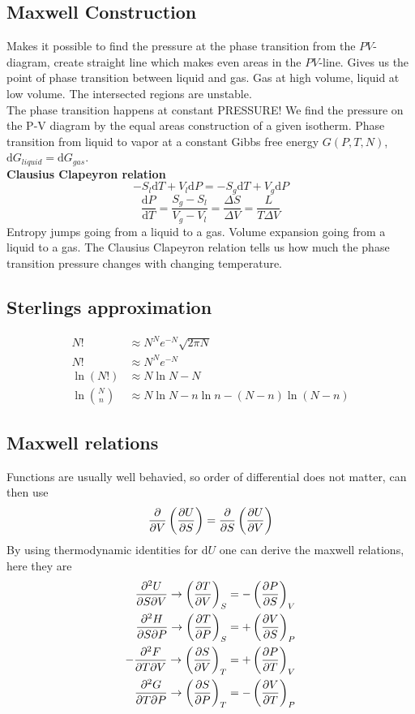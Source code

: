 \documentclass[a4paper, norsk, 8pt]{article}
\begin{document}
\begin{multicols*}{3}
\subsection*{\footnotesize Maxwell Construction}
Makes it possible to find the pressure at the phase transition from the $PV$-diagram, create straight line which makes even areas in the $PV$-line. Gives us the point of phase transition between liquid and gas. Gas at high volume, liquid at low volume. The intersected regions are unstable.\\
The phase transition happens at constant PRESSURE! We find the pressure on the P-V diagram by the equal areas construction of a given isotherm. Phase transition from liquid to vapor at a constant Gibbs free energy $G(P, T, N)$, $\mbox{d}G_{liquid} = \mbox{d}G_{gas}$.\\
\textbf{Clausius Clapeyron relation}
$$-S_l\mbox{d}T + V_l\mbox{d}P = -S_g\mbox{d}T+V_g\mbox{d}P $$
$$ \frac{\mbox{d}P}{\mbox{d}T} = \frac{S_g-S_l}{V_g-V_l} = \frac{\Delta S}{\Delta V} = \frac{L}{T\Delta V}$$
Entropy jumps going from a liquid to a gas. Volume expansion going from a liquid to a gas. The Clausius Clapeyron relation tells us how much the phase transition pressure changes with changing temperature.

\subsection*{\footnotesize  Sterlings approximation}
\begin{align*}
  N! &\approx N^Ne^{-N}\sqrt{2\pi N} \\
  N! &\approx N^Ne^{-N} \\
  \ln{(N!)} &\approx N\ln{N}-N \\
  \ln{\binom{N}{n}}  &\approx N\ln{N}-n\ln{n}-(N-n)\ln{\left(N-n\right)}
\end{align*}


\subsection*{\footnotesize  Maxwell relations}
Functions are usually well behavied, so order of differential does not matter, can then use
\begin{equation*}
    \pdv{}{V}\left( \pdv{U}{S} \right) = \pdv{}{S}\left( \pdv{U}{V} \right)
\end{equation*}
By using thermodynamic identities for d$U$ one can derive the maxwell relations, here they are
\begin{align*}
  \pdv{U}{S}{V} \rightarrow \left( \pdv{T}{V} \right)_S &= - \left( \pdv{P}{S} \right)_V \\
  \pdv{H}{S}{P} \rightarrow \left( \pdv{T}{P} \right)_S &= + \left( \pdv{V}{S} \right)_P \\
  -\pdv{F}{T}{V} \rightarrow \left( \pdv{S}{V} \right)_T &= + \left( \pdv{P}{T} \right)_V \\
  \pdv{G}{T}{P} \rightarrow \left( \pdv{S}{P} \right)_T &= - \left( \pdv{V}{T} \right)_P \\
\end{align*}


\end{multicols*}
\end{document}
